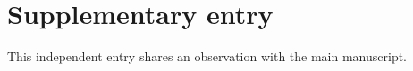 \documentclass{article}
\begin{document}
\section{Supplementary entry}
This independent entry shares an observation with the main manuscript.

\end{document}
